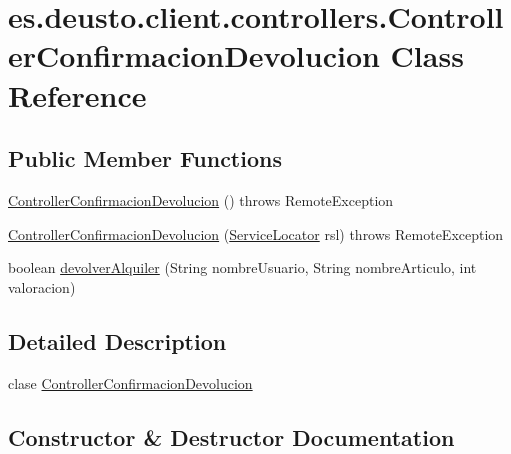 \hypertarget{classes_1_1deusto_1_1client_1_1controllers_1_1_controller_confirmacion_devolucion}{}\section{es.\+deusto.\+client.\+controllers.\+Controller\+Confirmacion\+Devolucion Class Reference}
\label{classes_1_1deusto_1_1client_1_1controllers_1_1_controller_confirmacion_devolucion}
\subsection*{Public Member Functions}
\begin{DoxyCompactItemize}
\item 
\mbox{\hyperlink{classes_1_1deusto_1_1client_1_1controllers_1_1_controller_confirmacion_devolucion_a732abf51e7fffd8d39a834566a7933da}{Controller\+Confirmacion\+Devolucion}} ()  throws Remote\+Exception 
\item 
\mbox{\hyperlink{classes_1_1deusto_1_1client_1_1controllers_1_1_controller_confirmacion_devolucion_a2d5ebddd9bda62462bfb0cb80846d2a4}{Controller\+Confirmacion\+Devolucion}} (\mbox{\hyperlink{classes_1_1deusto_1_1client_1_1remote_1_1_service_locator}{Service\+Locator}} rsl)  throws Remote\+Exception 
\item 
boolean \mbox{\hyperlink{classes_1_1deusto_1_1client_1_1controllers_1_1_controller_confirmacion_devolucion_ac318220c8b7e2761db4de06988bafd45}{devolver\+Alquiler}} (String nombre\+Usuario, String nombre\+Articulo, int valoracion)
\end{DoxyCompactItemize}


\subsection{Detailed Description}
clase \mbox{\hyperlink{classes_1_1deusto_1_1client_1_1controllers_1_1_controller_confirmacion_devolucion}{Controller\+Confirmacion\+Devolucion}} 

\subsection{Constructor \& Destructor Documentation}
\mbox{\label{classes_1_1deusto_1_1client_1_1controllers_1_1_controller_confirmacion_devolucion_a732abf51e7fffd8d39a834566a7933da}} 
